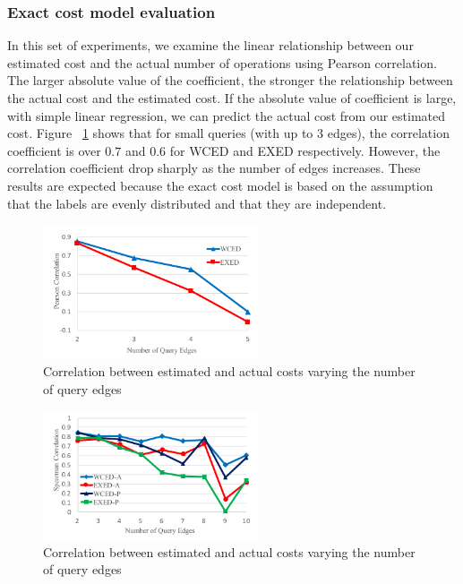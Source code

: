 \documentclass{sigmod}
\begin{document}
\subsubsection{Exact cost model evaluation}
In this set of experiments, we examine the linear relationship between our estimated cost  and the actual number of operations using Pearson correlation. The larger absolute value of the coefficient, the stronger the relationship between the actual cost and the estimated cost. If the absolute value of coefficient  is large, with  simple linear regression, we can predict the actual cost from our estimated cost. Figure ~\ref{fig:exact-cost} shows that for small queries (with up to $3$ edges), the correlation coefficient is over $0.7$ and $0.6$ for WCED and EXED respectively. However, the correlation coefficient drop sharply as the number of edges increases. These results are expected because the exact cost model is based on the assumption that the labels are evenly distributed and that they are independent.
\begin{figure}[htb] 
\setlength{\abovecaptionskip}{-0.5\baselineskip}
\setlength{\belowcaptionskip}{-0.5\baselineskip}
\centering\includegraphics[width=2.5in]{exact_cost.pdf} 
\caption{Correlation between estimated and actual costs varying the number of query edges}
\label{fig:exact-cost}
\end{figure}

\begin{figure}[htb] 
\setlength{\abovecaptionskip}{-0.5\baselineskip}
\setlength{\belowcaptionskip}{-1.5\baselineskip}
\centering\includegraphics[width=2.5in]{ub_spearman.pdf} 
\caption{Correlation between estimated and actual costs varying the number of query edges}
\label{fig:sel}
\end{figure}
\end{document}
